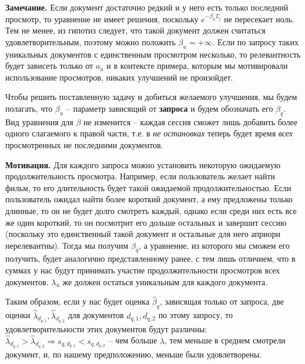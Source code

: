 \documentclass[diploma]{nanolab2015}
\begin{document}
\textbf{Замечание.} Если документ достаточно редкий и у него есть только последний просмотр, то уравнение не имеет решения, поскольку $e^{-\beta_u T_j}$ не пересекает ноль. Тем не менее, из гипотиз следует, что такой документ должен считаться удовлетворительным, поэтому можно положить $\beta_u = +\infty$. Если по запросу таких уникальных документов с единственным просмотром несколько, то релевантность будет зависеть только от $a_u$ и в контексте примера, которым мы мотивировали использование просмотров, никаких улучшений не произойдет.

Чтобы решить поставленную задачу и добиться желаемого улучшения, мы будем полагать, что $\beta_u$ -- параметр зависящий от \textbf{запроса} и будем обозначать его $\beta_q$. Вид уравнения для $\beta$ не изменится -- каждая сессия сможет лишь добавить более одного слагаемого к правой части, т.е. в \textit{не остановках} теперь будет время \textit{всех} просмотренных не последними документов. 

\textbf{Мотивация.} Для каждого запроса можно установить некоторую ожидаемую продолжительность просмотра. Например, если пользователь желает найти фильм, то его длительность будет такой ожидаемой продолжительностью. Если пользователь ожидал найти более короткий документ, а ему предложены только длинные, то он не будет долго смотреть каждый, однако если среди них есть все же один короткий, то он посмотрит его дольше остальных и завершит сессию (поскольку это единственный такой документ и остальные для него априори нерелевантны). Тогда мы получим $\beta_q$, а уравнение, из которого мы сможем его получить, будет аналогично представленному ранее, с тем лишь отличием, что в суммах у нас будут принимать участие продолжительности просмотров всех документов. $\lambda_u$ же должен остаться уникальным для каждого документа.

Таким образом, если у нас будет оценка $\hat{\beta}_q$, зависящая только от запроса, две оценки $\hat{\lambda}_{d_{q,1}}, \hat{\lambda}_{d_{q,2}}$ для документов $d_{q,1}, d_{q,2}$ по этому запросу, то удовлетворительности этих документов будут различны: $\hat{\lambda}_{d_{q,1}} > \hat{\lambda}_{d_{q,2}} \Rightarrow s_{q,d_{q,1}} < s_{q,d_{q,2}}$ -- чем больше $\lambda$, тем меньше в среднем смотрели документ, и, по нашему предположению, меньше были удовлетворены.
\end{document}
